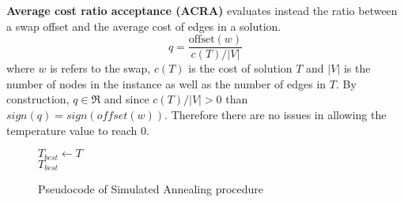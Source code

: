 \textbf{Average cost ratio acceptance (ACRA)} evaluates instead the ratio between a swap offset and the average cost of edges in a solution.
\[
    q = \frac{\text{offset}(w)}{c(T)/|V|}
\]
where $w$ is refers to the swap, $c(T)$ is the cost of solution $T$ and $|V|$ is the number of nodes in the instance as well as the number of edges in $T$.
By construction, $q \in \Re$ and since $c(T)/|V| > 0$ than $sign(q) = sign(offset(w))$.
Therefore there are no issues in allowing the temperature value to reach 0.

\begin{figure}[htbp]
    \begin{algorithm}[H]
        \BlankLine
        $T_{best} \gets T$\\
        \Return $T_{best}$
    \end{algorithm}
    \caption{Pseudocode of Simulated Annealing procedure} \label{fig:simannPseudocode}
\end{figure}

